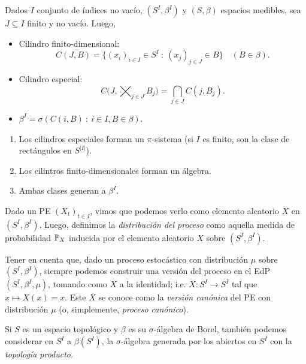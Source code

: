 
Dados $I$ conjunto de índices no vacío, $(S^{I}, \beta^{I})$ y $(S, \beta)$ espacios medibles, sea $J \subseteq I$ finito y no vacío. Luego,

\begin{itemize}
	\item Cilindro finito-dimensional:
	\[ C(J, B) = \{(x_{i})_{i \in I} \in S^{I} \ : \ (x_{j})_{j \in J} \in B \} \quad (B \in \beta). \]

	\item Cilindro especial:
	\[ C \Big( J, \bigtimes_{j \in J} B_{j} \Big) = \bigcap_{j \in J} C(j, B_{j}). \]
	
	\item $\beta^{I} = \sigma(C(i, B) \ : \ i \in I, B \in \beta)$.
\end{itemize}

\begin{remark}
	\begin{enumerate}
		\item Los cilindros especiales forman un $\pi$-sistema (si $I$ es finito, son la clase de rectángulos en $S^{|I|}$).

		\item Los cilintros finito-dimensionales forman un álgebra.

		\item Ambas clases generan a $\beta^{I}$.
	\end{enumerate}
\end{remark}

Dado un PE $(X_{t})_{t \in I}$, vimos que podemos verlo como elemento aleatorio $X$ en $(S^{I}, \beta^{I})$. Luego, definimos la \textit{distribución del proceso} como aquella medida de probabilidad $\mathbb{P}_{X}$ inducida por el elemento aleatorio $X$ sobre $(S^{I}, \beta^{I})$. \par
Tener en cuenta que, dado un proceso estocástico con distribución $\mu$ sobre $(S^{I}, \beta^{I})$, siempre podemos construir una versión del proceso en el EdP $(S^{I}, \beta^{I}, \mu)$, tomando como $X$ a la identidad; i.e. $X \colon S^{I} \to S^{I}$ tal que $x \mapsto X(x) = x$. Este $X$ se conoce como la \textit{versión canónica} del PE con distribución $\mu$ (o, simplemente, \textit{proceso canónico}).

\begin{remark}
	Si $S$ es un espacio topológico y $\beta$ es su $\sigma$-álgebra de Borel, también podemos considerar en $S^{I}$ a $\beta(S^{I})$, la $\sigma$-álgebra generada por los abiertos en $S^{I}$ con la \textit{topología producto}.
\end{remark}

